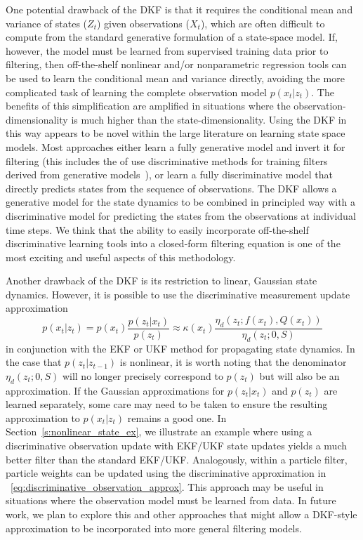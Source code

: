 One potential drawback of the DKF is that it requires the conditional mean and variance of states ($Z_t$) given observations ($X_t$), which are often difficult to compute from the standard generative formulation of a state-space model. If, however, the model must be learned from supervised training data prior to filtering, then off-the-shelf nonlinear and/or nonparametric regression tools can be used to learn the conditional mean and variance directly, avoiding the more complicated task of learning the complete observation model $p(x_t|z_t)$. The benefits of this simplification are amplified in situations where the observation-dimensionality is much higher than the state-dimensionality. Using the DKF in this way appears to be novel within the large literature on learning state space models. Most approaches either learn a fully generative model and invert it for filtering (this includes the of use discriminative methods for training filters derived from generative models~\cite{Abb05,Hes09}), or learn a fully discriminative model that directly predicts states from the sequence of observations. The DKF allows a generative model for the state dynamics to be combined in principled way with a discriminative model for predicting the states from the observations at individual time steps.  We think that the ability to easily incorporate off-the-shelf discriminative learning tools into a closed-form filtering equation is one of the most exciting and useful aspects of this methodology.

Another drawback of the DKF is its restriction to linear, Gaussian state dynamics.  However, it is possible to use the discriminative measurement update approximation 
\begin{equation} \label{eq:discriminative_observation_approx}
p(x_t|z_t) =  p(x_t) \frac{p(z_t|x_t)}{p(z_t)}
\approx \kappa(x_t) \frac{\eta_d(z_t;f(x_t),Q(x_t))}{\eta_d(z_t;0,S)}
\end{equation}
in conjunction with the EKF or UKF method for propagating state dynamics.  In the case that $p(z_t|z_{t-1})$ is nonlinear, it is worth noting that the denominator $\eta_d(z_t;0,S)$ will no longer precisely correspond to $p(z_t)$ but will also be an approximation.  If the Gaussian approximations for $p(z_t|x_t)$ and $p(z_t)$ are learned separately, some care may need to be taken to ensure the resulting approximation to $p(x_t|z_t)$ remains a good one.  In Section~\ref{s:nonlinear_state_ex}, we illustrate an example where using a discriminative observation update with EKF/UKF state updates yields a much better filter than the standard EKF/UKF.  Analogously, within a particle filter, particle weights can be updated using the discriminative approximation in ~\eqref{eq:discriminative_observation_approx}.  This approach may be useful in situations where the observation model must be learned from data.  In future work, we plan to explore this and other approaches that might allow a DKF-style approximation to be incorporated into more general filtering models.

